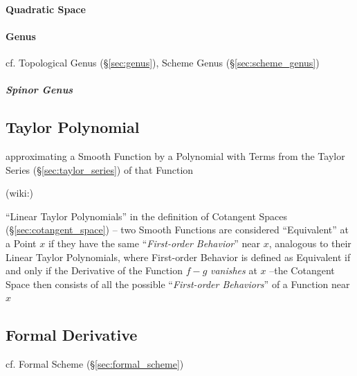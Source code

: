 \paragraph{Quadratic Space}\label{sec:quadratic_space}\hfill

\paragraph{Genus}\label{sec:quadratic_genus}\hfill

\fist cf. Topological Genus (\S\ref{sec:genus}), Scheme Genus
(\S\ref{sec:scheme_genus})



\subparagraph{Spinor Genus}\label{sec:spinor_genus}\hfill



\subsection{Taylor Polynomial}\label{sec:taylor_polynomial}

approximating a Smooth Function by a Polynomial with Terms from the
Taylor Series (\S\ref{sec:taylor_series}) of that Function

(wiki:)

``Linear Taylor Polynomials'' in the definition of Cotangent Spaces
(\S\ref{sec:cotangent_space}) -- two Smooth Functions are considered
``Equivalent'' at a Point $x$ if they have the same ``\emph{First-order
  Behavior}'' near $x$, analogous to their Linear Taylor Polynomials,
where First-order Behavior is defined as Equivalent if and only if the
Derivative of the Function $f-g$ \emph{vanishes} at $x$ --the Cotangent Space
then consists of all the possible ``\emph{First-order Behaviors}'' of a
Function near $x$



\subsection{Formal Derivative}\label{sec:formal_derivative}


cf. Formal Scheme (\S\ref{sec:formal_scheme})



